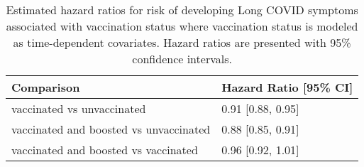 \begin{table}[!htbp]
\centering
\begin{tabular}{ll}
  \hline
Comparison & Hazard Ratio [95\% CI] \\ 
  \hline
vaccinated vs unvaccinated & 0.91 [0.88, 0.95] \\ 
  vaccinated and boosted vs unvaccinated & 0.88 [0.85, 0.91] \\ 
  vaccinated and boosted vs vaccinated & 0.96 [0.92, 1.01] \\ 
   \hline
\end{tabular}
\caption{Estimated hazard ratios for risk of developing Long COVID symptoms associated with vaccination status where vaccination status is modeled as time-dependent covariates. Hazard ratios are presented with 95\% confidence intervals.} 
\label{tab:cox_time_dep_emm_pairs}
\end{table}
